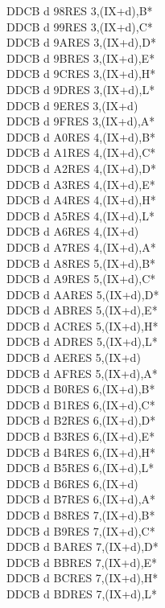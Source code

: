 \documentclass[oneside,a4paper]{book}
\begin{document}
\begin{multicols}{3}
{\begin{tabbing}
DDCB d 98\>RES 3,(IX+d),B*\\
DDCB d 99\>RES 3,(IX+d),C*\\
DDCB d 9A\>RES 3,(IX+d),D*\\
DDCB d 9B\>RES 3,(IX+d),E*\\
DDCB d 9C\>RES 3,(IX+d),H*\\
DDCB d 9D\>RES 3,(IX+d),L*\\
DDCB d 9E\>RES 3,(IX+d)\\
DDCB d 9F\>RES 3,(IX+d),A*\\
DDCB d A0\>RES 4,(IX+d),B*\\
DDCB d A1\>RES 4,(IX+d),C*\\
DDCB d A2\>RES 4,(IX+d),D*\\
DDCB d A3\>RES 4,(IX+d),E*\\
DDCB d A4\>RES 4,(IX+d),H*\\
DDCB d A5\>RES 4,(IX+d),L*\\
DDCB d A6\>RES 4,(IX+d)\\
DDCB d A7\>RES 4,(IX+d),A*\\
DDCB d A8\>RES 5,(IX+d),B*\\
DDCB d A9\>RES 5,(IX+d),C*\\
DDCB d AA\>RES 5,(IX+d),D*\\
DDCB d AB\>RES 5,(IX+d),E*\\
DDCB d AC\>RES 5,(IX+d),H*\\
DDCB d AD\>RES 5,(IX+d),L*\\
DDCB d AE\>RES 5,(IX+d)\\
DDCB d AF\>RES 5,(IX+d),A*\\
DDCB d B0\>RES 6,(IX+d),B*\\
DDCB d B1\>RES 6,(IX+d),C*\\
DDCB d B2\>RES 6,(IX+d),D*\\
DDCB d B3\>RES 6,(IX+d),E*\\
DDCB d B4\>RES 6,(IX+d),H*\\
DDCB d B5\>RES 6,(IX+d),L*\\
DDCB d B6\>RES 6,(IX+d)\\
DDCB d B7\>RES 6,(IX+d),A*\\
DDCB d B8\>RES 7,(IX+d),B*\\
DDCB d B9\>RES 7,(IX+d),C*\\
DDCB d BA\>RES 7,(IX+d),D*\\
DDCB d BB\>RES 7,(IX+d),E*\\
DDCB d BC\>RES 7,(IX+d),H*\\
DDCB d BD\>RES 7,(IX+d),L*\\

\end{tabbing}}
\end{multicols}
\end{document}
